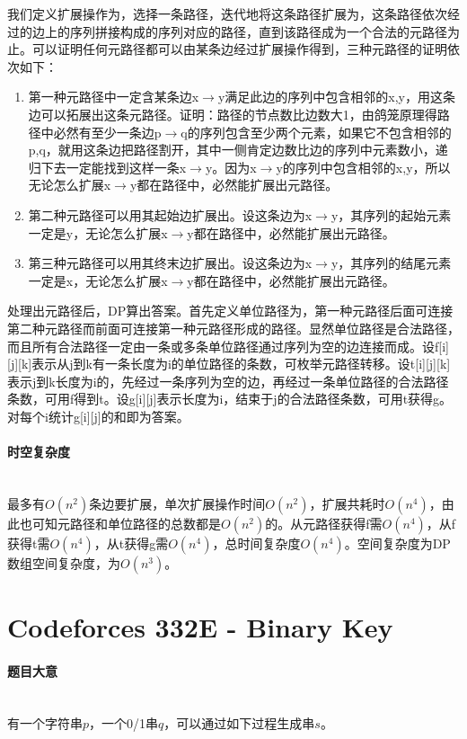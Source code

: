 \documentclass[UTF8]{ctexart}
\newcommand{\myparagraph}[1]{\paragraph{#1}\mbox{}\\}
\theoremstyle{nonumberplain}
\begin{document}
			我们定义扩展操作为，选择一条路径，迭代地将这条路径扩展为，这条路径依次经过的边上的序列拼接构成的序列对应的路径，直到该路径成为一个合法的元路径为止。可以证明任何元路径都可以由某条边经过扩展操作得到，三种元路径的证明依次如下：
			
			\begin{enumerate}
				\item 第一种元路径中一定含某条边x$\rightarrow$y满足此边的序列中包含相邻的x,y，用这条边可以拓展出这条元路径。证明：路径的节点数比边数大1，由鸽笼原理得路径中必然有至少一条边p$\rightarrow$q的序列包含至少两个元素，如果它不包含相邻的p,q，就用这条边把路径割开，其中一侧肯定边数比边的序列中元素数小，递归下去一定能找到这样一条x$\rightarrow$y。因为x$\rightarrow$y的序列中包含相邻的x,y，所以无论怎么扩展x$\rightarrow$y都在路径中，必然能扩展出元路径。
				\item 第二种元路径可以用其起始边扩展出。设这条边为x$\rightarrow$y，其序列的起始元素一定是y，无论怎么扩展x$\rightarrow$y都在路径中，必然能扩展出元路径。
				\item 第三种元路径可以用其终末边扩展出。设这条边为x$\rightarrow$y，其序列的结尾元素一定是x，无论怎么扩展x$\rightarrow$y都在路径中，必然能扩展出元路径。
			\end{enumerate}
			
			处理出元路径后，DP算出答案。首先定义单位路径为，第一种元路径后面可连接第二种元路径而前面可连接第一种元路径形成的路径。显然单位路径是合法路径，而且所有合法路径一定由一条或多条单位路径通过序列为空的边连接而成。设f[i][j][k]表示从j到k有一条长度为i的单位路径的条数，可枚举元路径转移。设t[i][j][k]表示j到k长度为i的，先经过一条序列为空的边，再经过一条单位路径的合法路径条数，可用f得到t。设g[i][j]表示长度为i，结束于j的合法路径条数，可用t获得g。对每个i统计g[i][j]的和即为答案。
		
		\myparagraph{时空复杂度}
		
			最多有$O(n^2)$条边要扩展，单次扩展操作时间$O(n^2)$，扩展共耗时$O(n^4)$，由此也可知元路径和单位路径的总数都是$O(n^2)$的。从元路径获得f需$O(n^4)$，从f获得t需$O(n^4)$，从t获得g需$O(n^4)$，总时间复杂度$O(n^4)$。空间复杂度为DP数组空间复杂度，为$O(n^3)$。
	
	\section{Codeforces 332E - Binary Key}
	
		\myparagraph{题目大意}
		
			有一个字符串$p$，一个0/1串$q$，可以通过如下过程生成串$s$。
			
\end{document}
